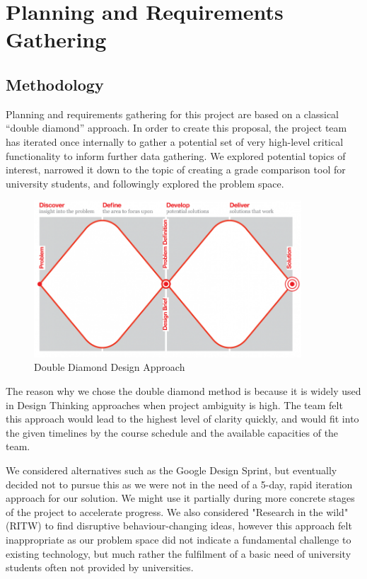 \section{Planning and Requirements Gathering}
\subsection{Methodology}
Planning and requirements gathering for this project are based on a classical ``double diamond'' approach. In order to create this proposal, the project team has iterated once internally to gather a potential set of very high-level critical functionality to inform further data gathering. We explored potential topics of interest, narrowed it down to the topic of creating a grade comparison tool for university students, and followingly explored the problem space.

\begin{figure}[H]
    \centering
    \includegraphics[width=10cm]{images/Double-Diamond-A3-for-publication-A-2000px_1.png}
    \caption{Double Diamond Design Approach}
    \label{fig:doublediamond}
\end{figure}

The reason why we chose the double diamond method is because it is widely used in Design Thinking approaches when project ambiguity is high. The team felt this approach would lead to the highest level of clarity quickly, and would fit into the given timelines by the course schedule and the available capacities of the team.

We considered alternatives such as the Google Design Sprint, but eventually decided not to pursue this as we were not in the need of a 5-day, rapid iteration approach for our solution. We might use it partially during more concrete stages of the project to accelerate progress. We also considered "Research in the wild" (RITW) to find disruptive behaviour-changing ideas, however this approach felt inappropriate as our problem space did not indicate a fundamental challenge to existing technology, but much rather the fulfilment of a basic need of university students often not provided by universities.


